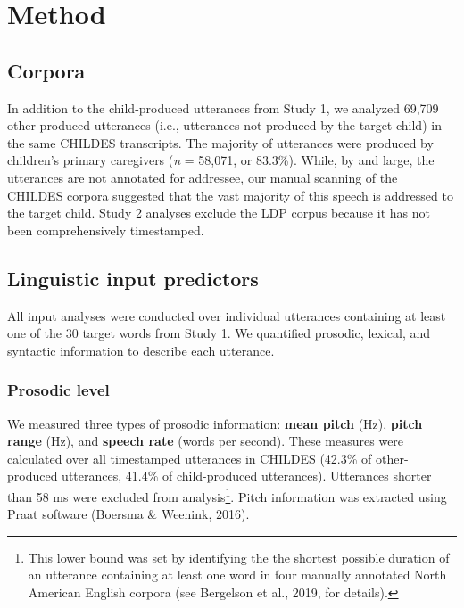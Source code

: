 \documentclass[10pt, letterpaper]{article}
\begin{document}
\hypertarget{method-1}{%
\section{Method}\label{method-1}}

\hypertarget{corpora-1}{%
\subsection{Corpora}\label{corpora-1}}

In addition to the child-produced utterances from Study 1, we analyzed
69,709 other-produced utterances (i.e., utterances not produced by the
target child) in the same CHILDES transcripts. The majority of
utterances were produced by children's primary caregivers (\emph{n} =
58,071, or 83.3\%). While, by and large, the utterances are not
annotated for addressee, our manual scanning of the CHILDES corpora
suggested that the vast majority of this speech is addressed to the
target child. Study 2 analyses exclude the LDP corpus because it has not
been comprehensively timestamped.

\hypertarget{linguistic-input-predictors}{%
\subsection{Linguistic input
predictors}\label{linguistic-input-predictors}}

All input analyses were conducted over individual utterances containing
at least one of the 30 target words from Study 1. We quantified
prosodic, lexical, and syntactic information to describe each utterance.

\hypertarget{prosodic-level}{%
\subsubsection{Prosodic level}\label{prosodic-level}}

We measured three types of prosodic information: \textbf{mean pitch}
(Hz), \textbf{pitch range} (Hz), and \textbf{speech rate} (words per
second). These measures were calculated over all timestamped utterances
in CHILDES (42.3\% of other-produced utterances, 41.4\% of
child-produced utterances). Utterances shorter than 58 ms were excluded
from analysis\footnote{This lower bound was set by identifying the the
  shortest possible duration of an utterance containing at least one
  word in four manually annotated North American English corpora (see
  Bergelson et al., 2019, for details).}. Pitch information was
extracted using Praat software (Boersma \& Weenink, 2016).
\end{document}
